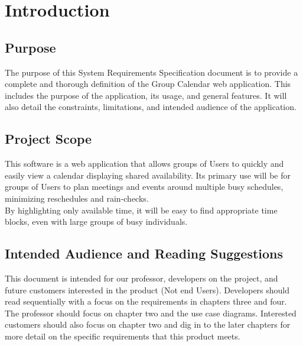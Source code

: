 \documentclass{scrreprt}
\begin{document}
\chapter{Introduction}

\section{Purpose}

The purpose of this System Requirements Specification document is to
provide a complete and thorough definition of the Group Calendar web application.
This includes the purpose of the application, its usage, and general features. It will
also detail the constraints, limitations, and intended audience of the application.


\section{Project Scope}

This software is a web application that allows groups of Users to quickly and easily
view a calendar displaying shared availability. Its primary use will be for groups of
Users to plan meetings and events around multiple busy schedules, minimizing
reschedules and rain-checks.
\\By highlighting only available time, it will be easy to find
appropriate time blocks, even with large groups of busy individuals.


\section{Intended Audience and Reading Suggestions}

This document is intended for our professor, developers on the project, and
future customers interested in the product (Not end Users). Developers should
read sequentially with a focus on the requirements in chapters three and four.
The professor should focus on chapter two and the use case diagrams. Interested
customers should also focus on chapter two and dig in to the later chapters for
more detail on the specific requirements that this product meets.
\end{document}
